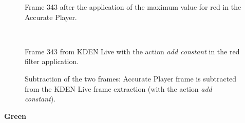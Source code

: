 \documentclass[../MasterThesis.tex]{subfiles}
\begin{document}
\begin{minipage}{0.48\textwidth}
	\begin{figure}[H]
		\begin{center}
			\caption[]{Frame 343 after the application of the maximum value for red in the Accurate Player.}
		\end{center}
	\end{figure}
\end{minipage}\begin{minipage}{0.04\textwidth}
	\ 
\end{minipage}\begin{minipage}{0.48\textwidth}
	\begin{figure}[H]
		\begin{center}
			\caption[]{Frame 343 from KDEN Live with the action \textit{add constant} in the red filter application.}
		\end{center}
	\end{figure}
\end{minipage}

\vspace*{-1em}

\begin{figure}[H]
	\begin{center}
		\caption[]{Subtraction of the two frames: Accurate Player frame is subtracted from the KDEN Live frame extraction (with the action \textit{add constant}).}
	\end{center}
\end{figure}





\vspace*{-1em}
\textbf{Green}

\vspace*{-1em}
\end{document}

